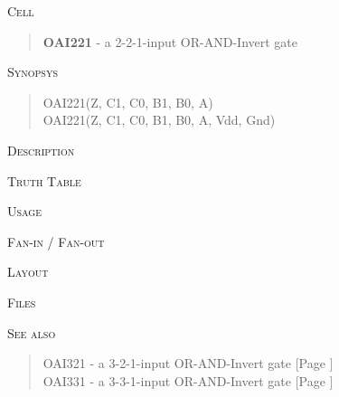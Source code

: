 
\label{OAI221}
\textsc{Cell}
\begin{quote}
    \textbf{OAI221} - a 2-2-1-input OR-AND-Invert gate
\end{quote}

\textsc{Synopsys}
\begin{quote}
    OAI221(Z, C1, C0, B1, B0, A) \\
    OAI221(Z, C1, C0, B1, B0, A, Vdd, Gnd)
\end{quote}

\textsc{Description}

%

\textsc{Truth Table}


\textsc{Usage}

\textsc{Fan-in / Fan-out}

\textsc{Layout}

\textsc{Files}

\textsc{See also}
\begin{quote}
    OAI321 - a 3-2-1-input OR-AND-Invert gate [Page \pageref{OAI321}] \\
    OAI331 - a 3-3-1-input OR-AND-Invert gate [Page \pageref{OAI331}]
\end{quote}
